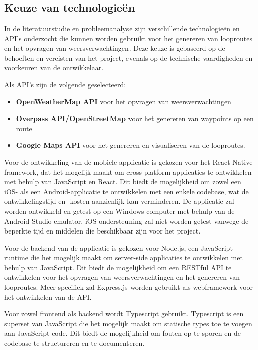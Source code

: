 \chapter{}%
\label{ch:uitwerking}

\section{Keuze van technologieën}

In de literatuurstudie en probleemanalyse zijn verschillende technologieën en API's onderzocht die kunnen worden gebruikt voor het genereren van looproutes en het opvragen van weersverwachtingen. Deze keuze is gebaseerd op de behoeften en vereisten van het project, evenals op de technische vaardigheden en voorkeuren van de ontwikkelaar.

Als API's zijn de volgende geselecteerd:
\begin{itemize}
    \item \textbf{OpenWeatherMap API} voor het opvragen van weersverwachtingen
    \item \textbf{Overpass API/OpenStreetMap} voor het genereren van waypoints op een route
    \item \textbf{Google Maps API} voor het genereren en visualiseren van de looproutes.
\end{itemize}

Voor de ontwikkeling van de mobiele applicatie is gekozen voor het React Native framework, dat het mogelijk maakt om cross-platform applicaties te ontwikkelen met behulp van JavaScript en React. Dit biedt de mogelijkheid om zowel een iOS- als een Android-applicatie te ontwikkelen met een enkele codebase, wat de ontwikkelingstijd en -kosten aanzienlijk kan verminderen. De applicatie zal worden ontwikkeld en getest op een Windows-computer met behulp van de Android Studio-emulator. iOS-ondersteuning zal niet worden getest vanwege de beperkte tijd en middelen die beschikbaar zijn voor het project.

Voor de backend van de applicatie is gekozen voor Node.js, een JavaScript runtime die het mogelijk maakt om server-side applicaties te ontwikkelen met behulp van JavaScript. Dit biedt de mogelijkheid om een RESTful API te ontwikkelen voor het opvragen van weersverwachtingen en het genereren van looproutes. Meer specifiek zal Express.js worden gebruikt als webframework voor het ontwikkelen van de API.

Voor zowel frontend als backend wordt Typescript gebruikt. Typescript is een superset van JavaScript die het mogelijk maakt om statische types toe te voegen aan JavaScript-code. Dit biedt de mogelijkheid om fouten op te sporen en de codebase te structureren en te documenteren.

